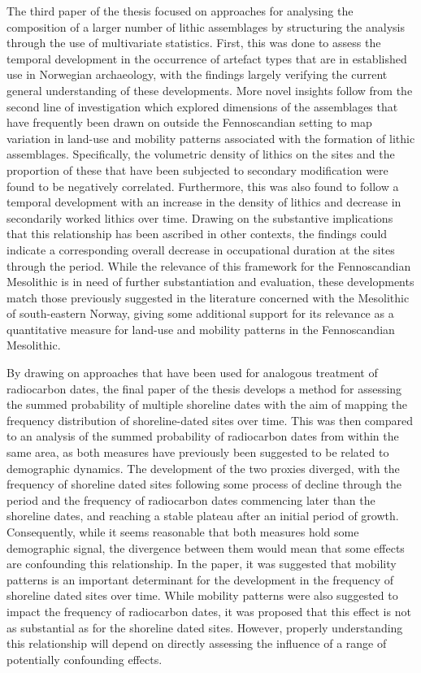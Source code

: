 The third paper of the thesis focused on approaches for analysing the composition of a larger number of lithic assemblages by structuring the analysis through the use of multivariate statistics. First, this was done to assess the temporal development in the occurrence of artefact types that are in established use in Norwegian archaeology, with the findings largely verifying the current general understanding of these developments. More novel insights follow from the second line of investigation which explored dimensions of the assemblages that have frequently been drawn on outside the Fennoscandian setting to map variation in land-use and mobility patterns associated with the formation of lithic assemblages. Specifically, the volumetric density of lithics on the sites and the proportion of these that have been subjected to secondary modification were found to be negatively correlated. Furthermore, this was also found to follow a temporal development with an increase in the density of lithics and decrease in secondarily worked lithics over time. Drawing on the substantive implications that this relationship has been ascribed in other contexts, the findings could indicate a corresponding overall decrease in occupational duration at the sites through the period. While the relevance of this framework for the Fennoscandian Mesolithic is in need of further substantiation and evaluation, these developments match those previously suggested in the literature concerned with the Mesolithic of south-eastern Norway, giving some additional support for its relevance as a quantitative measure for land-use and mobility patterns in the Fennoscandian Mesolithic.  

By drawing on approaches that have been used for analogous treatment of radiocarbon dates, the final paper of the thesis develops a method for assessing the summed probability of multiple shoreline dates with the aim of mapping the frequency distribution of shoreline-dated sites over time. This was then compared to an analysis of the summed probability of radiocarbon dates from within the same area, as both measures have previously been suggested to be related to demographic dynamics. The development of the two proxies diverged, with the frequency of shoreline dated sites following some process of decline through the period and the frequency of radiocarbon dates commencing later than the shoreline dates, and reaching a stable plateau after an initial period of growth. Consequently, while it seems reasonable that both measures hold some demographic signal, the divergence between them would mean that some effects are confounding this relationship. In the paper, it was suggested that mobility patterns is an important determinant for the development in the frequency of shoreline dated sites over time. While mobility patterns were also suggested to impact the frequency of radiocarbon dates, it was proposed that this effect is not as substantial as for the shoreline dated sites. However, properly understanding this relationship will depend on directly assessing the influence of a range of potentially confounding effects.


